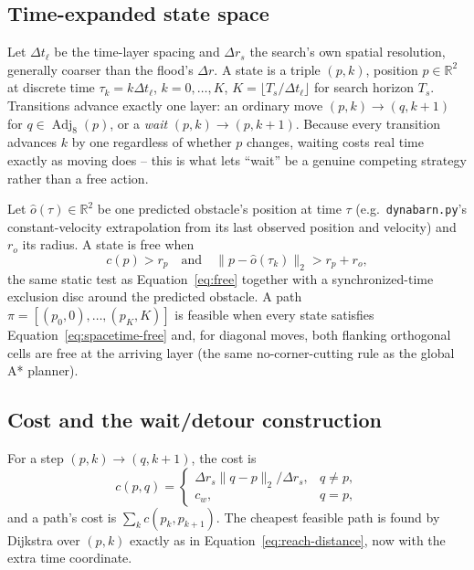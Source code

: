 \documentclass[11pt,a4paper]{article}
\newcommand{\R}{\mathbb{R}}
\newcommand{\Adj}{\operatorname{Adj}}
\begin{document}
\subsection{Time-expanded state space}

Let $\Delta t_\ell$ be the time-layer spacing and $\Delta r_s$ the search's
own spatial resolution, generally coarser than the flood's $\Delta r$. A
state is a triple $(p,k)$, position $p\in\R^2$ at discrete time
$\tau_k=k\Delta t_\ell$, $k=0,\ldots,K$, $K=\lfloor T_s/\Delta t_\ell\rfloor$
for search horizon $T_s$. Transitions advance exactly one layer: an ordinary
move $(p,k)\to(q,k+1)$ for $q\in\Adj_8(p)$, or a \emph{wait}
$(p,k)\to(p,k+1)$. Because every transition advances $k$ by one regardless of
whether $p$ changes, waiting costs real time exactly as moving does -- this
is what lets ``wait'' be a genuine competing strategy rather than a free
action.

Let $\hat o(\tau)\in\R^2$ be one predicted obstacle's position at time $\tau$
(e.g.\ \texttt{dynabarn.py}'s constant-velocity extrapolation from its last
observed position and velocity) and $r_o$ its radius. A state is free when
\begin{equation}
  c(p)>r_p
  \quad\text{and}\quad
  \lVert p-\hat o(\tau_k)\rVert_2>r_p+r_o,
  \label{eq:spacetime-free}
\end{equation}
the same static test as Equation~\eqref{eq:free} together with
a synchronized-time exclusion disc around the predicted obstacle. A path
$\pi=[(p_0,0),\ldots,(p_K,K)]$ is feasible when every state satisfies
Equation~\eqref{eq:spacetime-free} and, for diagonal moves, both flanking
orthogonal cells are free at the arriving layer (the same no-corner-cutting
rule as the global A* planner).

\subsection{Cost and the wait/detour construction}

For a step $(p,k)\to(q,k+1)$, the cost is
\begin{equation}
  c(p,q)=
  \begin{cases}
    \Delta r_s\lVert q-p\rVert_2/\Delta r_s, & q\ne p,\\[2pt]
    c_w, & q=p,
  \end{cases}
  \label{eq:spacetime-step-cost}
\end{equation}
and a path's cost is $\sum_k c(p_k,p_{k+1})$. The cheapest feasible path is
found by Dijkstra over $(p,k)$ exactly as in Equation~\eqref{eq:reach-distance},
now with the extra time coordinate.
\end{document}
